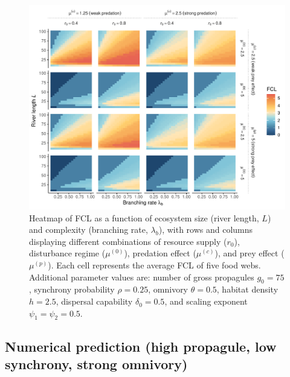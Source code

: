 \begin{figure}
\centering
\includegraphics{../data_fmt/fig_rho025_g75_theta05.pdf}
\caption{Heatmap of FCL as a function of ecosystem size (river length,
\(L\)) and complexity (branching rate, \(\lambda_b\)), with rows and
columns displaying different combinations of resource supply (\(r_0\)),
disturbance regime (\(\mu^{(0)}\)), predation effect (\(\mu^{(c)}\)),
and prey effect (\(\mu^{(p)}\)). Each cell represents the average FCL of
five food webs. Additional parameter values are: number of gross
propagules \(g_0=75\), synchrony probability \(\rho=0.25\), omnivory
\(\theta=0.5\), habitat density \(h=2.5\), dispersal capability
\(\delta_0=0.5\), and scaling exponent \(\psi_1=\psi_2=0.5\).}
\end{figure}

\newpage

\subsection*{Numerical prediction (high propagule, low synchrony, strong
omnivory)}\label{numerical-prediction-high-propagule-low-synchrony-strong-omnivory}

